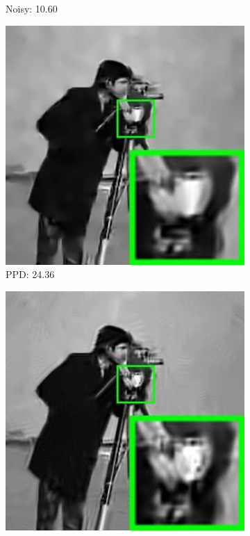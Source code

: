 \begin{figure}
\begin{subfigure}[t]{0.24\textwidth}
		\caption{Noisy: 10.60}
    \end{subfigure}
    \hfill
    \begin{subfigure}[t]{0.24\textwidth}
        \centering
        \includegraphics[width=1\textwidth]{images/pgpd/pgdpd/br_GMM65_75_cameraman.jpg}
		\caption{PPD: 24.36}
    \end{subfigure}
    \hfill
    \begin{subfigure}[t]{0.24\textwidth}
        \centering
        \includegraphics[width=1\textwidth]{images/pgpd/pgdpd/br_our_75_cameraman.jpg}

\end{subfigure}
\end{figure}
